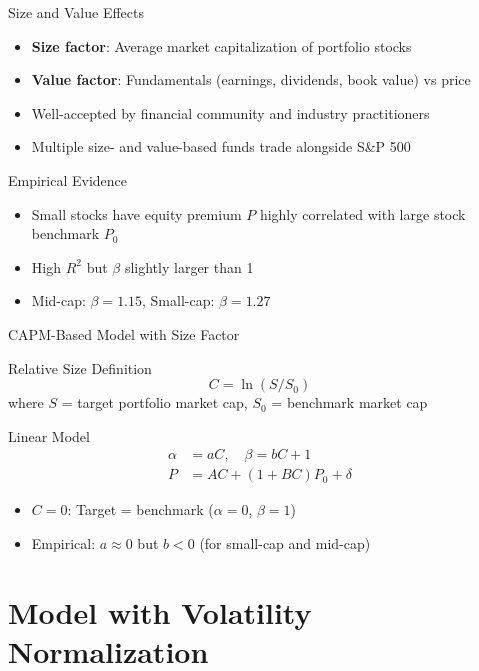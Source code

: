 \documentclass{beamer}
\begin{document}
\begin{frame}{Size and Value Effects}
\begin{itemize}
    \item \textbf{Size factor}: Average market capitalization of portfolio stocks
    \item \textbf{Value factor}: Fundamentals (earnings, dividends, book value) vs price
    \item Well-accepted by financial community and industry practitioners
    \item Multiple size- and value-based funds trade alongside S\&P 500
\end{itemize}

\vspace{0.3cm}
\begin{block}{Empirical Evidence}
\begin{itemize}
    \item Small stocks have equity premium $P$ highly correlated with large stock benchmark $P_0$
    \item High $R^2$ but $\beta$ slightly larger than 1
    \item Mid-cap: $\beta = 1.15$, Small-cap: $\beta = 1.27$
\end{itemize}
\end{block}
\end{frame}

\begin{frame}{CAPM-Based Model with Size Factor}
\begin{block}{Relative Size Definition}
$$C = \ln(S/S_0)$$
where $S$ = target portfolio market cap, $S_0$ = benchmark market cap
\end{block}

\begin{block}{Linear Model}
\begin{align*}
\alpha &= aC, \quad \beta = bC + 1\\
P &= AC + (1 + BC)P_0 + \delta
\end{align*}
\end{block}

\begin{itemize}
    \item $C = 0$: Target = benchmark ($\alpha = 0$, $\beta = 1$)
    \item Empirical: $a \approx 0$ but $b < 0$ (for small-cap and mid-cap)
\end{itemize}
\end{frame}

\section{Model with Volatility Normalization}
\end{document}
